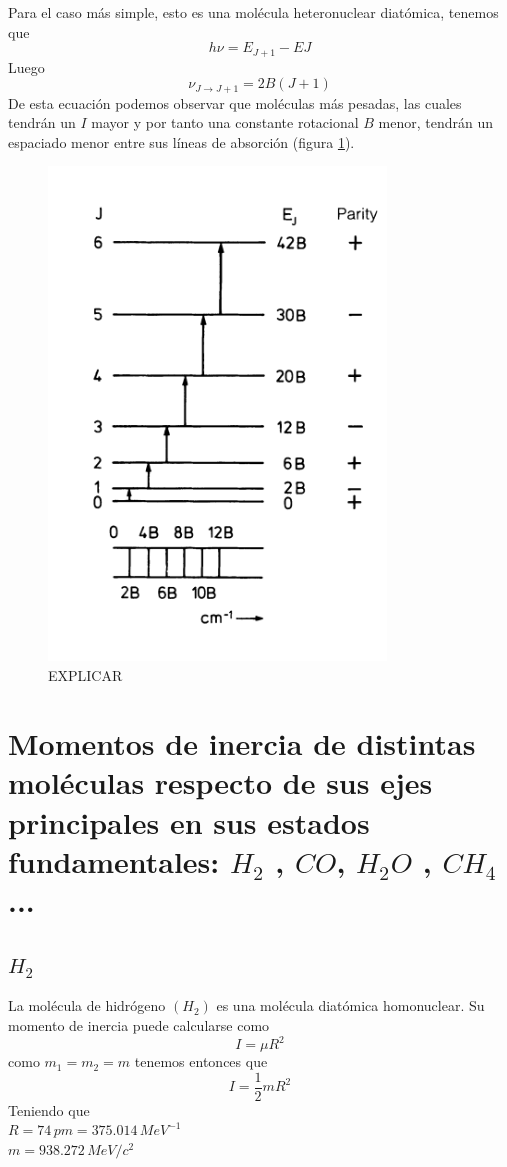 \documentclass[a4paper]{article}
\begin{document}
Para el caso más simple, esto es una molécula heteronuclear diatómica, tenemos que 
\begin{equation}
h\nu = E_{J+1}-E{J}
\end{equation}
Luego
\begin{equation}
\nu_{J \rightarrow J+1} = 2B(J+1)
\end{equation}
De esta ecuación podemos observar que moléculas más pesadas, las cuales tendrán un $I$ mayor y por tanto una constante rotacional $B$ menor, tendrán un espaciado menor entre sus líneas de absorción (figura \ref{niveles1}).
\begin{figure}
\includegraphics[width=0.8\textwidth]{niveles1.png}
\caption{EXPLICAR}
\label{niveles1}
\end{figure}
\section{Momentos de inercia de distintas moléculas respecto de sus ejes principales en sus estados fundamentales: $H_2$ , $CO$, $H_2O$ , $CH_4$ ...}
\subsection{$H_2$}
La molécula de hidrógeno $(H_2)$ es una molécula diatómica homonuclear. Su momento de inercia puede calcularse como $$I=\mu R^2$$
como $m_1=m_2=m$ tenemos entonces que $$I=\frac{1}{2}mR^2$$
Teniendo que\\
 $R=74 \, pm=375.014 \, MeV^{-1}$\\
 $m=938.272 \, MeV/c^2$\\
 
\end{document}
